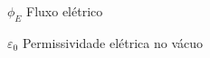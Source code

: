 
\begin{simbolos}
    \item[$ \phi_E $] Fluxo elétrico
    \item[$ \varepsilon_0 $] Permissividade elétrica no vácuo
\end{simbolos}
